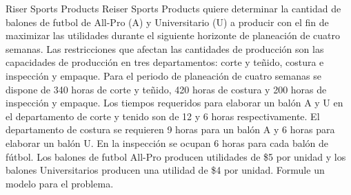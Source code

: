 \begin{frameact}{Riser Sports Products}{}
  Reiser Sports Products quiere determinar la cantidad de balones de futbol de All-Pro (A)
y Universitario (U) a producir con el ﬁn de maximizar las utilidades durante el siguiente horizonte de planeación de cuatro semanas. Las restricciones que afectan las cantidades de
producción son las capacidades de producción en tres departamentos: corte y teñido, costura
e inspección y empaque. Para el periodo de planeación de cuatro semanas se dispone de 340 horas de corte y teñido, 420 horas de costura y 200 horas de inspección y empaque. Los tiempos requeridos para elaborar un balón A y U en el departamento de corte y tenido son de 12 y 6 horas respectivamente. El departamento de costura se requieren 9 horas para un balón A y 6 horas para elaborar un balón U. En la inspección se ocupan 6 horas para cada balón de fútbol. Los balones de futbol All-Pro producen utilidades de \$5 por unidad y los balones Universitarios producen una utilidad de \$4 por unidad. Formule un modelo para el problema.
\end{frameact}



